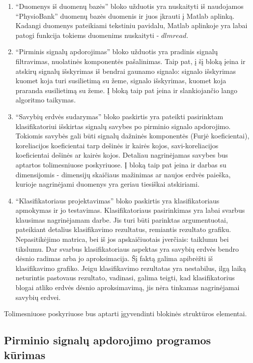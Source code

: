 \documentclass[]{vgtuef}
\begin{document}
\begin{enumerate}
\item ``Duomenys iš duomenų bazės'' bloko užduotis yra nuskaityti iš
  naudojamos ``PhysioBank'' duomenų bazės duomenis ir juos įkrauti į
  Matlab aplinką. Kadangi duomenys pateikiami tekstiniu pavidalu,
  Matlab aplinkoje yra labai patogi funkcija tokiems duomenims
  nuskaityti - $dlmread$.
\item ``Pirminis signalų apdorojimas'' bloko užduotis yra pradinis
  signalų filtravimas, nuolatinės komponentės pašalinimas. Taip pat, į
  šį bloką įeina ir atskirų signalų išskyrimas iš bendrai gaunamo
  signalo: signalo išskyrimas kuomet koja turi susilietimą su žeme,
  signalo išskyrimas, kuomet koja praranda susilietimą su žeme. Į
  bloką taip pat įeina ir slankiojančio lango algoritmo taikymas.
\item ``Savybių erdvės sudarymas'' bloko paskirtis yra pateikti
  pasirinktam klasifikatoriui išskirtas signalų savybes po pirminio
  signalo apdorojimo. Tokiomis savybės gali būti signalų dažninės
  komponentės (Furjė koeficientai), koreliacijos koeficientai tarp
  dešinės ir kairės kojos, savi-koreliacijos koeficientai dešinės ar
  kairės kojos. Detaliau nagrinėjamas savybes bus aptartos
  tolimesniuose poskyriuose. Į bloką taip pat įeina ir darbas su
  dimensijomis - dimensijų skaičiaus mažinimas ar naujos erdvės
  paieška, kurioje nagrinėjami duomenys yra geriau tiesiškai
  atskiriami.
\item ``Klasifikatoriaus projektavimas'' bloko paskirtis yra
  klasifikatoriaus apmokymas ir jo testavimas. Klasifikatoriaus
  pasirinkimas yra labai svarbus klausimas nagrinėjamam darbe. Jis
  turi būti parinktas argumentuotai, pateikiant detalius klasifikavimo
  rezultatus, remiantis rezultato grafiku. Nepasitikėjimo matrica, bei
  iš jos apskaičiuotais įverčiais: taiklumu bei tikslumu. Dar svarbus
  klasifikatoriaus aspektas yra savybių erdvės bendro dėsnio radimas
  arba jo aproksimacija. Šį faktą galima apibrėžti iš klasifikavimo
  grafiko. Jeigu klasifikavimo rezultatas yra nestabilus, ilgą laiką
  neturintis pastovaus rezultato, vadinasi, galima teigti, kad
  klasifikatorius blogai atliko erdvės dėsnio aproksimavimą, jis nėra
  tinkamas nagrinėjamai savybių erdvei.
\end{enumerate}

Tolimesniuose poskyriuose bus aptarti įgyvendinti blokinės struktūros elementai.

\subsection{Pirminio signalų apdorojimo programos kūrimas}
\end{document}
